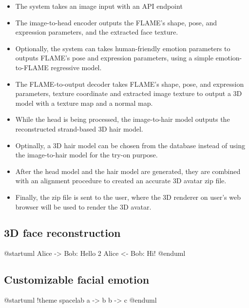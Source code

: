 \begin{itemize}
    \item The system takes an image input with an API endpoint
    \item The image-to-head encoder outputs the FLAME's shape, pose, and expression parameters, and the extracted face texture.
    \item Optionally, the system can takes human-friendly emotion parameters to outputs FLAME's pose and expression parameters, using a simple emotion-to-FLAME regressive model.
    \item The FLAME-to-output decoder takes FLAME's shape, pose, and expression parameters, texture coordinate and extracted image texture to output a 3D model with a texture map and a normal map.
    \item While the head is being processed, the image-to-hair model outputs the reconstructed strand-based 3D hair model.
    \item Optinally, a 3D hair model can be chosen from the database instead of using the image-to-hair model for the try-on purpose.
    \item After the head model and the hair model are generated, they are combined with an alignment procedure to created an accurate 3D avatar zip file.
    \item Finally, the zip file is sent to the user, where the 3D renderer on user's web browser will be used to render the 3D avatar.
\end{itemize}


\subsection{3D face reconstruction}

\begin{plantuml}
    @startuml
    Alice -> Bob: Hello 2
    Alice <- Bob: Hi!
    @enduml
\end{plantuml}

\subsection{Customizable facial emotion}

\begin{plantuml}
    @startuml
    !theme spacelab
    a -> b
    b -> c
    @enduml
\end{plantuml}
